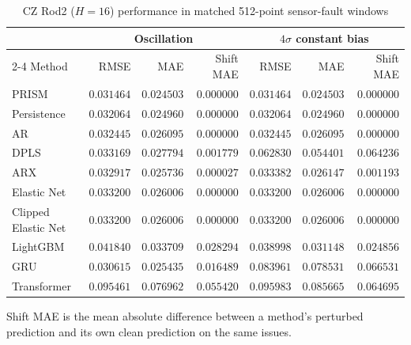 \begin{table}[!t]
\centering
\caption{CZ Rod2 ($H=16$) performance in matched 512-point sensor-fault windows}
\label{tab:fault-rod2}
\small
\begin{tabular}{lrrrrrr}
\hline
 & \multicolumn{3}{c}{Oscillation} & \multicolumn{3}{c}{$4\sigma$ constant bias} \\
\cline{2-4}\cline{5-7}
Method & RMSE & MAE & Shift MAE & RMSE & MAE & Shift MAE \\
\hline
PRISM & \(0.031464\) & \(0.024503\) & \(0.000000\) & \(0.031464\) & \(0.024503\) & \(0.000000\) \\
Persistence & \(0.032064\) & \(0.024960\) & \(0.000000\) & \(0.032064\) & \(0.024960\) & \(0.000000\) \\
AR & \(0.032445\) & \(0.026095\) & \(0.000000\) & \(0.032445\) & \(0.026095\) & \(0.000000\) \\
DPLS & \(0.033169\) & \(0.027794\) & \(0.001779\) & \(0.062830\) & \(0.054401\) & \(0.064236\) \\
ARX & \(0.032917\) & \(0.025736\) & \(0.000027\) & \(0.033382\) & \(0.026147\) & \(0.001193\) \\
Elastic Net & \(0.033200\) & \(0.026006\) & \(0.000000\) & \(0.033200\) & \(0.026006\) & \(0.000000\) \\
Clipped Elastic Net & \(0.033200\) & \(0.026006\) & \(0.000000\) & \(0.033200\) & \(0.026006\) & \(0.000000\) \\
LightGBM & \(0.041840\) & \(0.033709\) & \(0.028294\) & \(0.038998\) & \(0.031148\) & \(0.024856\) \\
GRU & \(0.030615\) & \(0.025435\) & \(0.016489\) & \(0.083961\) & \(0.078531\) & \(0.066531\) \\
Transformer & \(0.095461\) & \(0.076962\) & \(0.055420\) & \(0.095983\) & \(0.085665\) & \(0.064695\) \\
\hline
\end{tabular}
\par\smallskip
\parbox{0.96\textwidth}{\footnotesize Shift MAE is the mean absolute difference between a method's perturbed prediction and its own clean prediction on the same issues.}
\end{table}
